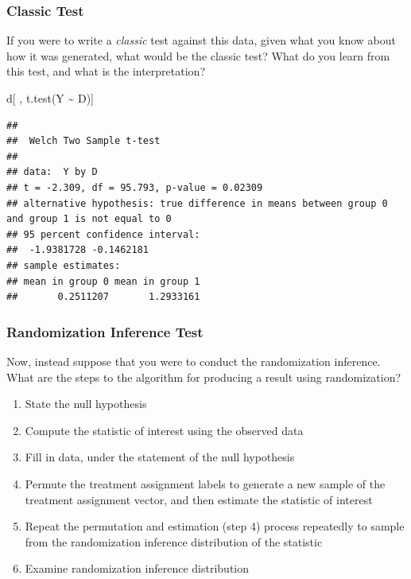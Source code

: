 \documentclass[
]{article}
\newenvironment{Shaded}{\begin{snugshade}}{\end{snugshade}}
\newcommand{\FunctionTok}[1]{\textcolor[rgb]{0.00,0.00,0.00}{#1}}
\newcommand{\NormalTok}[1]{#1}
\newcommand{\SpecialCharTok}[1]{\textcolor[rgb]{0.00,0.00,0.00}{#1}}
\providecommand{\tightlist}{%
  \setlength{\itemsep}{0pt}\setlength{\parskip}{0pt}}
\begin{document}
\hypertarget{classic-test}{%
\subsubsection{Classic Test}\label{classic-test}}

If you were to write a \emph{classic} test against this data, given what you know about how it was generated, what would be the classic test? What do you learn from this test, and what is the interpretation?

\begin{Shaded}
\begin{Highlighting}[]
\NormalTok{d[ , }\FunctionTok{t.test}\NormalTok{(Y }\SpecialCharTok{\textasciitilde{}}\NormalTok{ D)]}
\end{Highlighting}
\end{Shaded}

\begin{verbatim}
## 
##  Welch Two Sample t-test
## 
## data:  Y by D
## t = -2.309, df = 95.793, p-value = 0.02309
## alternative hypothesis: true difference in means between group 0 and group 1 is not equal to 0
## 95 percent confidence interval:
##  -1.9381728 -0.1462181
## sample estimates:
## mean in group 0 mean in group 1 
##       0.2511207       1.2933161
\end{verbatim}

\hypertarget{randomization-inference-test}{%
\subsubsection{Randomization Inference Test}\label{randomization-inference-test}}

Now, instead suppose that you were to conduct the randomization inference. What are the steps to the algorithm for producing a result using randomization?

\begin{enumerate}
\def\labelenumi{\arabic{enumi}.}
\tightlist
\item
  State the null hypothesis
\item
  Compute the statistic of interest using the observed data
\item
  Fill in data, under the statement of the null hypothesis
\item
  Permute the treatment assignment labels to generate a new sample of the treatment assignment vector, and then estimate the statistic of interest
\item
  Repeat the permutation and estimation (step 4) process repeatedly to sample from the randomization inference distribution of the statistic
\item
  Examine randomization inference distribution
\end{enumerate}
\end{document}
